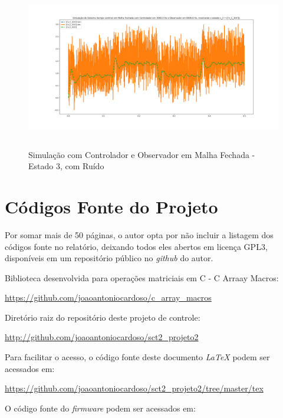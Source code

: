 \documentclass[
	12pt,				%
	article,			%
	openright,			%
	oneside,
	a4paper,			%
	chapter=TITLE,		%
	section=TITLE,		%
	english,			%
	french,				%
	spanish,			%
	brazil,				%
]{abntex2}
\begin{document}
\begin{apendicesenv}
        	\begin{figure}[htbp]
            	\centering
            	\caption{Simulação com Controlador e Observador em Malha Fechada - Estado 3, com Ruído}
            	\includegraphics[width=\textwidth,height=240px,keepaspectratio]{imgs/step_response_closedloop_observer_state3_noise.png}
            	\label{fig-step_response_closedloop_observer_state3_noise}
        	\end{figure}
        	
        	\FloatBarrier
        	
    	\clearpage
        \chapter{Códigos Fonte do Projeto}
            \label{ap-scripts}
            Por somar mais de 50 páginas, o autor opta por não incluir a listagem dos códigos fonte no relatório, deixando todos  eles abertos em licença GPL3, disponíveis em um repositório público no \textit{github} do autor.
            
            Biblioteca desenvolvida para operações matriciais em C - C Arraay Macros:
            
            \url{https://github.com/joaoantoniocardoso/c_array_macros}
            
            Diretório raiz do repositório deste projeto de controle:
            
            \url{http://github.com/joaoantoniocardoso/sct2_projeto2}
            
            Para facilitar o acesso, o código fonte deste documento \textit{LaTeX} podem ser acessados em:
            
            \url{https://github.com/joaoantoniocardoso/sct2_projeto2/tree/master/tex}
            
            O código fonte do \textit{firmware} podem ser acessados em:
            

\end{apendicesenv}
\end{document}
